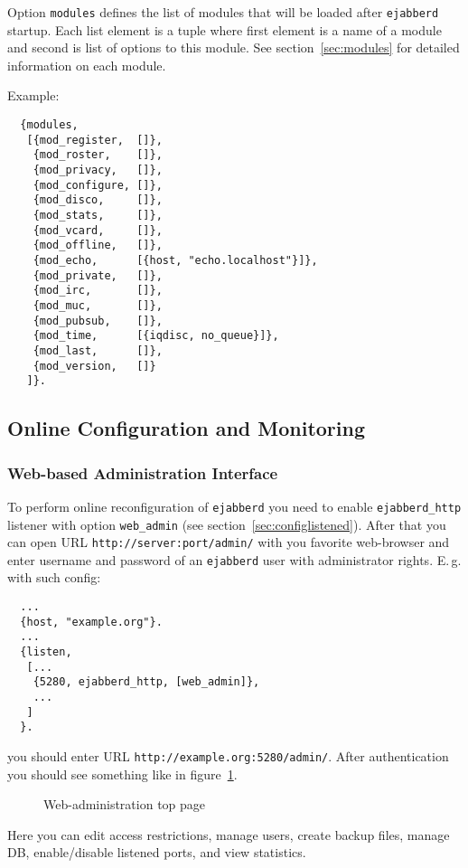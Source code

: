 \documentclass[a4paper,10pt]{article}
\newcommand{\imgscale}{0.58}
\newcommand{\insimg}[1]{\insscaleimg{\imgscale}{#1}}
\newcommand{\insscaleimg}[2]{
  \imgsrc{#2}{}
  \begin{latexonly}
    \scalebox{#1}{\texttt{[image: \#2]}}
  \end{latexonly}
}
\newcommand{\term}[1]{\texttt{#1}}
\newcommand{\ejabberd}{\texttt{ejabberd}}
\begin{document}
Option \term{modules} defines the list of modules that will be loaded after
\ejabberd{} startup.  Each list element is a tuple where first element is a
name of a module and second is list of options to this module.  See
section~\ref{sec:modules} for detailed information on each module.

Example:
\begin{verbatim}
  {modules,
   [{mod_register,  []},
    {mod_roster,    []},
    {mod_privacy,   []},
    {mod_configure, []},
    {mod_disco,     []},
    {mod_stats,     []},
    {mod_vcard,     []},
    {mod_offline,   []},
    {mod_echo,      [{host, "echo.localhost"}]},
    {mod_private,   []},
    {mod_irc,       []},
    {mod_muc,       []},
    {mod_pubsub,    []},
    {mod_time,      [{iqdisc, no_queue}]},
    {mod_last,      []},
    {mod_version,   []}
   ]}.
\end{verbatim}


\subsection{Online Configuration and Monitoring}
\label{sec:onlineconfig}

\subsubsection{Web-based Administration Interface}
\label{sec:webadm}

To perform online reconfiguration of \ejabberd{} you need to enable
\term{ejabberd\_http} listener with option \term{web\_admin} (see
section~\ref{sec:configlistened}).  After that you can open URL
\verb|http://server:port/admin/| with you favorite web-browser and enter
username and password of an \ejabberd{} user with administrator rights.  E.\,g.
with such config:
\begin{verbatim}
  ...
  {host, "example.org"}.
  ...
  {listen,
   [...
    {5280, ejabberd_http, [web_admin]},
    ...
   ]
  }.
\end{verbatim}
you should enter URL \verb|http://example.org:5280/admin/|.  After
authentication you should see something like in figure~\ref{fig:webadmmain}.
\begin{figure}[htbp]
  \centering
  \insimg{webadmmain.png}
  \caption{Web-administration top page}
  \label{fig:webadmmain}
\end{figure}
Here you can edit access restrictions, manage users, create backup files,
manage DB, enable/disable listened ports, and view statistics.
\end{document}
